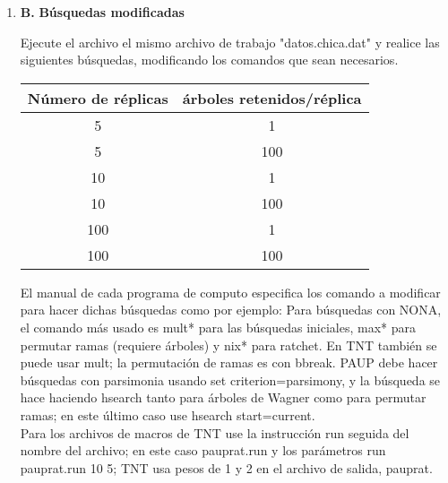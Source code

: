 \begin{itemize}
\begin{enumerate}
    {Preguntas}
    ¿Qu\'e tipo de información usted puede obtener cuando carga el archivo de trabajo?

    ¿C\'ual es la b\'usqueda por omisión en cada programa utilizado?\\


\item{\textbf{B. }}\textbf{B\'usquedas modificadas}

Ejecute el archivo el mismo archivo de trabajo  "datos.chica.dat" y realice las siguientes b\'usquedas,  modificando los comandos que sean necesarios.\\
 

 \begin{table}[H]
 \centering
 \begin{tabular}{|c|c|}
 \hline
  N\'umero de r\'eplicas & \'arboles retenidos/r\'eplica\\
 \hline
  5 & 1\\ 
   \hline
  5 & 100\\
   \hline 
  10& 1\\ 
   \hline
   10& 100\\
    \hline 
  100 & 1 \\
   \hline
   100 & 100 \\
  \hline
  
  
 \end{tabular}
 
 \end{table}
 
El manual de cada programa de computo especifica los comando a modificar para hacer dichas b\'usquedas como por ejemplo: Para b\'usquedas con NONA,  el comando m\'as usado es mult*  para las b\'usquedas iniciales,   max*  para permutar ramas (requiere \'arboles) y nix*  para ratchet. En TNT tambi\'en se puede usar mult; la permutaci\'on de ramas es con bbreak.  PAUP debe hacer  b\'usquedas con parsimonia usando set criterion=parsimony,  y la b\'usqueda se hace haciendo hsearch tanto para \'arboles de Wagner como para permutar ramas; en este \'ultimo caso use hsearch start=current.\\

Para los archivos de macros de TNT use la instrucci\'on run seguida del nombre del archivo; en este caso pauprat.run y los par\'ametros run pauprat.run 10 5; TNT usa pesos de 1 y 2 en el archivo de salida,  pauprat.
 

\end{enumerate}
\end{itemize}
